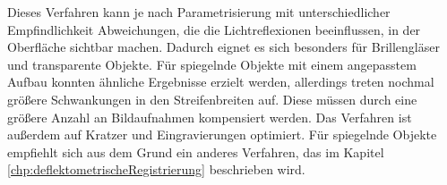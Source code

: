 \p
Dieses Verfahren kann je nach Parametrisierung mit unterschiedlicher Empfindlichkeit Abweichungen, die die Lichtreflexionen beeinflussen, in der Oberfläche sichtbar machen.
Dadurch eignet es sich besonders für Brillengläser und transparente Objekte.
Für spiegelnde Objekte mit einem angepasstem Aufbau konnten ähnliche Ergebnisse erzielt werden, allerdings treten nochmal größere Schwankungen in den Streifenbreiten auf.
Diese müssen durch eine größere Anzahl an Bildaufnahmen kompensiert werden.
Das Verfahren ist außerdem auf Kratzer und Eingravierungen optimiert.
Für spiegelnde Objekte empfiehlt sich aus dem Grund ein anderes Verfahren, das im Kapitel \ref{chp:deflektometrischeRegistrierung} beschrieben wird.